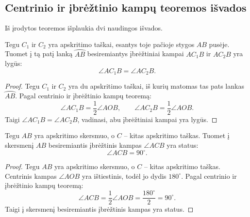 \documentclass[11pt,a4paper]{scrartcl}
\begin{document}
\subsection{Centrinio ir įbrėžtinio kampų teoremos išvados}
Iš įrodytos teoremos išplaukia dvi naudingos išvados.
\begin{corollary}
Tegu $C_1$ ir $C_2$ yra apskritimo taškai, esantys toje pačioje stygos $AB$ pusėje. Tuomet į tą patį lanką $\wideparen{AB}$ besiremiantys įbrėžtiniai kampai $AC_1B$ ir $AC_2B$ yra lygūs:
\[
\angle AC_1B=\angle AC_2B.
\]
\end{corollary}
\begin{proof}
Tegu $C_1$ ir $C_2$ yra du apskritimo taškai, iš kurių matomas tas pats lankas $\wideparen{AB}$. Pagal centrinio ir įbrėžtinio kampų teoremą:
\[
\angle AC_1B=\frac{1}{2}\angle AOB,
\qquad
\angle AC_2B=\frac{1}{2}\angle AOB.
\]
Taigi $\angle AC_1B=\angle AC_2B$, vadinasi, abu įbrėžtiniai kampai yra lygūs.
\end{proof}

\begin{center}
\end{center}

\begin{corollary}
Tegu $AB$ yra apskritimo skersmuo, o $C$ – kitas apskritimo taškas. Tuomet į skersmenį $AB$ besiremiantis įbrėžtinis kampas $\angle ACB$ yra status:
\[
\angle ACB=90^\circ.
\]
\end{corollary}
\begin{proof}
Tegu $AB$ yra apskritimo skersmuo, o $C$ – kitas apskritimo taškas. Centrinis kampas $\angle AOB$ yra ištiestinis, todėl jo dydis $180^\circ$. Pagal centrinio ir įbrėžtinio kampų teoremą:
\[
\angle ACB=\frac{1}{2}\angle AOB=\frac{180^\circ}{2}=90^\circ.
\]
Taigi į skersmenį besiremiantis įbrėžtinis kampas yra status.
\end{proof}
\end{document}
